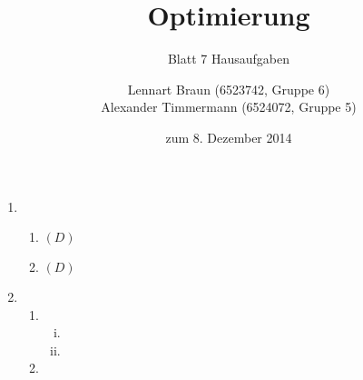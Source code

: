 \documentclass[a4paper]{scrartcl}
\title{Optimierung}
\subtitle{Blatt 7 Hausaufgaben}
\author{
	Lennart Braun (6523742, Gruppe 6) \\
    Alexander Timmermann (6524072, Gruppe 5)
}
\date{zum 8. Dezember 2014}
\begin{document}
\maketitle

\begin{enumerate}[label=\bfseries\arabic*.]
    \item %
        \begin{enumerate}
            \item $(D)$

            \item $(D)$

        \end{enumerate}

    \item %
        \begin{enumerate}
            \item
                \begin{enumerate}[(i)]
                    \item

                    \item

                \end{enumerate}

            \item

        \end{enumerate}

\end{enumerate}
\end{document}
